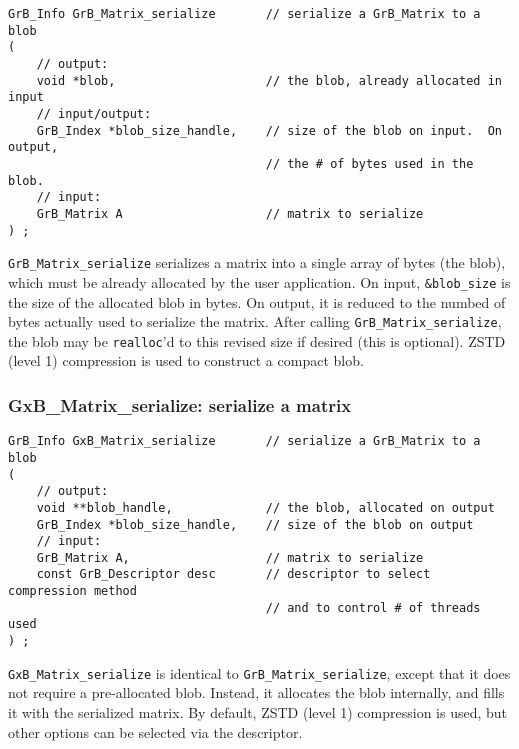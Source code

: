 \documentclass[12pt]{article}
\begin{document}
\begin{mdframed}[userdefinedwidth=6in]
{\footnotesize
\begin{verbatim}
GrB_Info GrB_Matrix_serialize       // serialize a GrB_Matrix to a blob
(
    // output:
    void *blob,                     // the blob, already allocated in input
    // input/output:
    GrB_Index *blob_size_handle,    // size of the blob on input.  On output,
                                    // the # of bytes used in the blob.
    // input:
    GrB_Matrix A                    // matrix to serialize
) ;
\end{verbatim}
} \end{mdframed}

\verb'GrB_Matrix_serialize' serializes a matrix into a single array of bytes
(the blob), which must be already allocated by the user application.
On input, \verb'&blob_size' is the size of the allocated blob in bytes.
On output, it is reduced to the numbed of bytes actually used to serialize
the matrix.  After calling \verb'GrB_Matrix_serialize', the blob may be
\verb'realloc''d to this revised size if desired (this is optional).
ZSTD (level 1) compression is used to construct a compact blob.

\subsubsection{{\sf GxB\_Matrix\_serialize:}      serialize a matrix}
\label{matrix_serialize_GxB}

\begin{mdframed}[userdefinedwidth=6in]
{\footnotesize
\begin{verbatim}
GrB_Info GxB_Matrix_serialize       // serialize a GrB_Matrix to a blob
(
    // output:
    void **blob_handle,             // the blob, allocated on output
    GrB_Index *blob_size_handle,    // size of the blob on output
    // input:
    GrB_Matrix A,                   // matrix to serialize
    const GrB_Descriptor desc       // descriptor to select compression method
                                    // and to control # of threads used
) ;
\end{verbatim}
} \end{mdframed}

\verb'GxB_Matrix_serialize' is identical to \verb'GrB_Matrix_serialize', except
that it does not require a pre-allocated blob.  Instead, it allocates the blob
internally, and fills it with the serialized matrix.  By default, ZSTD (level 1)
compression is used, but other options can be selected via the descriptor.
\end{document}
